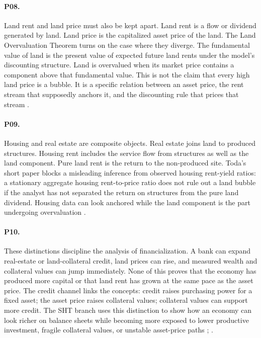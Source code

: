 \documentclass[11pt]{article}
\begin{document}
\paragraph{P08.} Land rent and land price must also be kept apart. Land rent is a flow or dividend generated by land. Land price is the capitalized asset price of the land. The Land Overvaluation Theorem turns on the case where they diverge. The fundamental value of land is the present value of expected future land rents under the model's discounting structure. Land is overvalued when its market price contains a component above that fundamental value. This is not the claim that every high land price is a bubble. It is a specific relation between an asset price, the rent stream that supposedly anchors it, and the discounting rule that prices that stream \citep[pp.~1, 3--4, 13]{hiranoToda2025UnbalancedGrowth}.

\paragraph{P09.} Housing and real estate are composite objects. Real estate joins land to produced structures. Housing rent includes the service flow from structures as well as the land component. Pure land rent is the return to the non-produced site. Toda's short paper blocks a misleading inference from observed housing rent-yield ratios: a stationary aggregate housing rent-to-price ratio does not rule out a land bubble if the analyst has not separated the return on structures from the pure land dividend. Housing data can look anchored while the land component is the part undergoing overvaluation \citep[pp.~1--3]{toda2025LandBubbles}.

\paragraph{P10.} These distinctions discipline the analysis of financialization. A bank can expand real-estate or land-collateral credit, land prices can rise, and measured wealth and collateral values can jump immediately. None of this proves that the economy has produced more capital or that land rent has grown at the same pace as the asset price. The credit channel links the concepts: credit raises purchasing power for a fixed asset; the asset price raises collateral values; collateral values can support more credit. The SHT branch uses this distinction to show how an economy can look richer on balance sheets while becoming more exposed to lower productive investment, fragile collateral values, or unstable asset-price paths \citep[pp.~16--18]{stiglitz2015LandCredit}; \citep[pp.~1, 15, 33, 38]{hiranoStiglitz2024CreditLandGrowth}.
\end{document}
